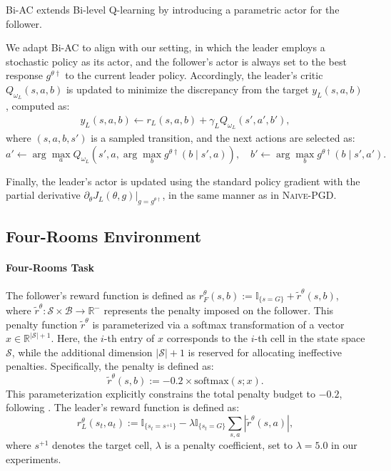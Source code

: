 \documentclass[letterpaper]{article} %
\providecommand{\R}{\mathbb{R}} %
\begin{document}
Bi-AC extends Bi-level Q-learning by introducing a parametric actor for the follower.

We adapt Bi-AC to align with our setting, in which the leader employs a stochastic policy as its actor, and the follower’s actor is always set to the best response $g^{\theta\dagger}$ to the current leader policy.  
Accordingly, the leader’s critic $Q_{\omega_L}(s, a, b)$ is updated to minimize the discrepancy from the target $y_L(s, a, b)$, computed as:
\begin{align}
y_L(s, a, b) \gets r_L(s, a, b) + \gamma_L Q_{\omega_L}(s', a', b'),
\end{align}
where $(s, a, b, s')$ is a sampled transition, and the next actions are selected as:
\begin{equation}
a' \gets \arg\max_{a} Q_{\omega_L}(s', a, \arg\max_{b} g^{\theta\dagger}(b \mid s', a)), \quad
b' \gets \arg\max_{b} g^{\theta\dagger}(b \mid s', a').
\end{equation}

Finally, the leader’s actor is updated using the standard policy gradient with the partial derivative  
$\partial_{\theta} J_L(\theta, g)\big|_{g = g^{\theta\dagger}}$,  
in the same manner as in \textsc{Naive-PGD}.

\subsection{Four-Rooms Environment}\label{apdx:fourrooms}

\paragraph{Four-Rooms Task}
The follower's reward function is defined as $r_F^{\theta}(s,b):=\mathbb{I}_{\{s=G\}}+\tilde{r}^{\theta}(s,b)$, where $\tilde{r}^{\theta}:\mathcal{S}\times\mathcal{B}\to\R^-$ represents the penalty imposed on the follower.
This penalty function $\tilde{r}^{\theta}$ is parameterized via a softmax transformation of a vector $x\in\R^{|\mathcal{S}|+1}$. Here, the $i$-th entry of $x$ corresponds to the $i$-th cell in the state space $\mathcal{S}$, while the additional dimension $|\mathcal{S}|+1$ is reserved for allocating ineffective penalties.
Specifically, the penalty is defined as:
\begin{equation}
    \tilde{r}^{\theta}(s,b):=-0.2\times \mathrm{softmax}(s;x).
\end{equation}
This parameterization explicitly constrains the total penalty budget to $-0.2$, following \citet{Thoma2024-em}.
The leader's reward function is defined as:
\begin{equation}
    r_L^{\theta}(s_t, a_t) := \mathbb{I}_{\{s_t = s^{+1}\}} - \lambda \mathbb{I}_{\{s_t = G\}} \sum_{s,a} |\tilde{r}^{\theta}(s,a)|,
\end{equation}
where $s^{+1}$ denotes the target cell, $\lambda$ is a penalty coefficient, set to $\lambda=5.0$ in our experiments.
\end{document}
